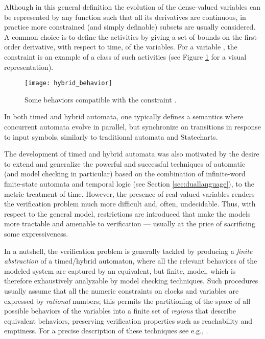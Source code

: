Although in this general definition the evolution of the dense-valued 
variables can be represented by any function such that all its derivatives are continuous, in practice 
more constrained (and simply definable) subsets are usually considered. 
A common choice is to define the activities by giving a set of 
bounds on the first-order derivative, with respect to time, of 
the variables. For a variable , the constraint 
is an example of a class of such activities (see Figure \ref{fig:hybrid_behavior} for a visual
representation).
\begin{figure}[htb!]
	 \centering
	 \texttt{[image: hybrid\_behavior]}
	 \caption{Some behaviors compatible with the constraint .}
	 \label{fig:hybrid_behavior}
\end{figure}

In both timed and hybrid automata, one typically defines a 
semantics where concurrent automata evolve in parallel, but synchronize 
on transitions in response to input symbols, similarly to traditional 
automata and Statecharts.

The development of timed and hybrid automata was also motivated 
by the desire to extend and generalize the powerful and
successful techniques of automatic  (and model checking 
in particular) based on the combination of infinite-word finite-state 
automata and temporal logic (see Section \ref{sec:duallanguage}), to the metric 
treatment of time. However, the presence of real-valued variables 
renders the verification problem much more difficult and, often, 
undecidable. Thus, with respect to the general model, restrictions 
are introduced that make the models more tractable and amenable 
to verification --- usually at the price of sacrificing some expressiveness.

In a nutshell, the verification problem is generally tackled 
by producing a \emph{finite abstraction} of a timed/hybrid automaton, 
where all the relevant behaviors of the modeled system are captured 
by an equivalent, but finite, model, which is therefore exhaustively 
analyzable by model checking techniques. Such procedures usually 
assume that all the numeric constraints on clocks and variables 
are expressed by \emph{rational} numbers; this permits the partitioning
of the space of all possible behaviors of the variables into a finite 
set of \emph{regions} that describe equivalent behaviors, preserving 
verification properties such as reachability and emptiness. 
For a precise description of these techniques see e.g., \cite{AM04,ACHHHNOSY95,HNSY94,HKPV98}.

